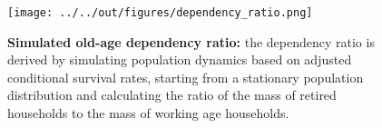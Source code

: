 \begin{figure}
    \label{fig:dependency_ratio}
    \texttt{[image: ../../out/figures/dependency\_ratio.png]}
    \caption{\textbf{Simulated old-age dependency ratio:} the dependency ratio is derived by simulating population dynamics based on adjusted conditional survival rates, starting from a stationary population distribution and calculating the ratio of the mass of retired households to the mass of working age households.}
\end{figure}

